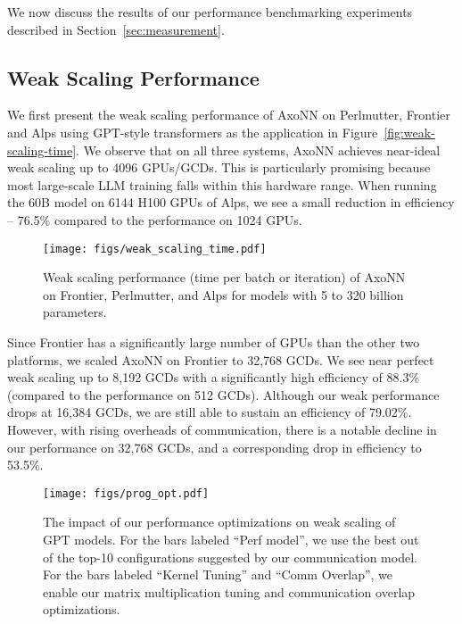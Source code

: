 

We now discuss the results of our performance benchmarking
experiments described in Section~\ref{sec:measurement}.

\subsection{Weak Scaling Performance}

We first present the weak scaling performance of AxoNN on Perlmutter, Frontier
and Alps using GPT-style transformers as the application in
Figure~\ref{fig:weak-scaling-time}.  We observe that on all three systems,
AxoNN achieves near-ideal weak scaling up to 4096 GPUs/GCDs. This is
particularly promising because most large-scale LLM training falls within this
hardware range. When running the 60B model on 6144 H100 GPUs of Alps, we see a
small reduction in efficiency -- 76.5\% compared to the performance on 1024
GPUs.

\begin{figure}[t]
  \centering
    \texttt{[image: figs/weak\_scaling\_time.pdf]}
    \caption{Weak scaling performance (time per batch or iteration) of AxoNN on Frontier, Perlmutter,
    and Alps for models with 5 to 320 billion parameters.}
    \label{fig:weak-scaling-time}
\label{fig:weak}
\end{figure}

Since Frontier has a significantly large number of GPUs than the other two
platforms, we scaled AxoNN on Frontier to 32,768 GCDs. We see near perfect weak
scaling up to 8,192 GCDs with a significantly high efficiency of 88.3\%
(compared to the performance on 512 GCDs). Although our weak performance drops
at 16,384 GCDs, we are still able to sustain an efficiency of 79.02\%.
However, with rising overheads of communication, there is a notable decline in
our performance on 32,768 GCDs, and a corresponding drop in efficiency to
53.5\%.

\begin{figure}[h]
  \centering
    \texttt{[image: figs/prog\_opt.pdf]}
    \caption{The impact of our performance optimizations on weak scaling of GPT
models.  For the bars labeled ``Perf model'', we use the best out of the top-10
configurations suggested by our communication model. For the bars labeled
``Kernel Tuning'' and ``Comm Overlap'', we enable our matrix multiplication
tuning and communication overlap optimizations.}
    \label{fig:weak-scaling-breakdown}
\label{fig:weak}
\end{figure}


